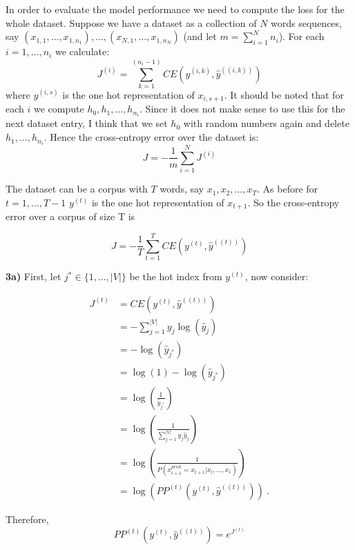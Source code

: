 \documentclass{article}
\begin{document}
In order to evaluate the model performance we need to compute the loss for the whole dataset. Suppose we have a dataset as a collection of $N$ words sequences, say $(x_{1,1}, \dots,x_{1,n_{1}}),\dots, (x_{N,1}, \dots,x_{1,n_{N}})$ (and let $m = \sum_{i=1}^{N}n_{i}$). For each $i=1, \dots, n_{i}$ we calculate: 
\begin{equation}\label{eq:28}
J^{(i)} = \sum_{k=1}^{(n_{i} -1)}CE(y^{(i,k)},\hat{y}^{((i,k))})
\end{equation}
where $y^{(i,s)}$ is the one hot representation of $x_{i,s+1}$. It should be noted that for each $i$ we compute $h_{0},h_{1}, \dots,h_{n_{i}}$. Since it does not make sense to use this for the next dataset entry, I think that we set $h_{0}$ with random numbers again and delete $h_{1}, \dots,h_{n_{i}}$. Hence the cross-entropy error over the dataset is:
\begin{equation}\label{eq:29}
J = -\frac{1}{m}\sum_{i=1}^{N}J^{(i)}
\end{equation}

The dataset can be a corpus with $T$ words, say $x_{1},x_{2}, \dots,x_{T}$. As before for $t = 1 ,\dots, T-1$ $y^{(t)}$ is the one hot representation of $x_{t+1}$. So the cross-entropy error over a corpus of size T is

\begin{equation}\label{eq:30}
J = -\frac{1}{T}\sum_{t=1}^{T}CE(y^{(t)},\hat{y}^{((t))})
\end{equation}

\textbf{3a)} First, let $j^{*} \in \{1, \dots, |V|\}$ be the hot index from $y^{(t)}$, now consider:

\begin{align*}
J^{(t)} & = CE(y^{(t)},\hat{y}^{((t))}) \\
& = -\sum_{j=1}^{|V|} y_j  \log(\hat{y}_j) \\
& = - \log(\hat{y}_{j^{*}})  \\
& = \log(1) - \log(\hat{y}_{j^{*}})\\
& =  \log(\frac{1}{\hat{y}_{j^{*}}})\\
& =  \log(\frac{1}{\sum_{j=1}^{|V|} y_j \hat{y}_j})\\
& =  \log(\frac{1}{ P(x^{pred}_{t+1} = x_{t+1} | x_{t}, \dots,x_{1})})\\
& =  \log(PP^{(t)}(y^{(t)},\hat{y}^{((t))}))\; .
\end{align*}

Therefore, 
\begin{equation}\label{eq:31}
PP^{(t)}(y^{(t)},\hat{y}^{((t))}) = e^{J^{(t)}}
\end{equation}
\end{document}
